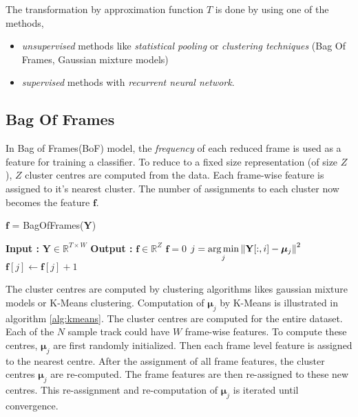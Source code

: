 \noindent The transformation by approximation function $T$ is done by using one of the methods,
\begin{itemize}
\setlength\itemsep{0em}
\item \textit{unsupervised} methods like \textit{statistical pooling} or \textit{clustering techniques} (Bag Of Frames, Gaussian mixture models)
\item \textit{supervised} methods with \textit{recurrent neural network}. 
\end{itemize} 
 
\subsection{Bag Of Frames}
\label{clustering}
In Bag of Frames(BoF) model\cite{BoF}, the \textit{frequency} of each reduced frame is used as a feature for training a classifier. To reduce to a fixed size representation (of size $Z$), $Z$ cluster centres are computed from the data. Each frame-wise feature is assigned to it's nearest cluster. The number of assignments to each cluster now becomes the feature $\textbf{f}$. 
\begin{algorithm}
  \caption{$\textbf{f}$ = BagOfFrames($\textbf{Y}$) }\label{bof}
  \begin{algorithmic}[1]
    \Statex \textbf{Input :} $\textbf{Y} \in \mathbb{R}^{T \times W}$
    \Statex \textbf{Output :} $\textbf{f} \in \mathbb{R}^{Z}$
    \State $\textbf{f} = 0$
    \State $j = \operatorname*{arg\,min}\limits_{j} \left\lVert\textbf{Y}[:,i] - \bm{\mu}_{j}\right\rVert^{2}$ 
    \State $\textbf{f}[j] \leftarrow \textbf{f}[j] + 1$
    \EndFor
  \end{algorithmic}
\end{algorithm}
\FloatBarrier
\noindent The cluster centres are computed by clustering algorithms likes gaussian mixture models or K-Means clustering. Computation of $\bm{\mu}_{j}$ by K-Means is illustrated in algorithm \ref{alg:kmeans}. The cluster centres are computed for the entire dataset. Each of the $N$ sample track could have $W$ frame-wise features. To compute these centres, $\bm{\mu}_{j}$ are first randomly initialized. Then each frame level feature is assigned to the nearest centre. After the assignment of all frame features, the cluster centres $\bm{\mu}_{j}$ are re-computed. The frame features are then re-assigned to these new centres. This re-assignment and re-computation of $\bm{\mu}_{j}$ is iterated until convergence.  
